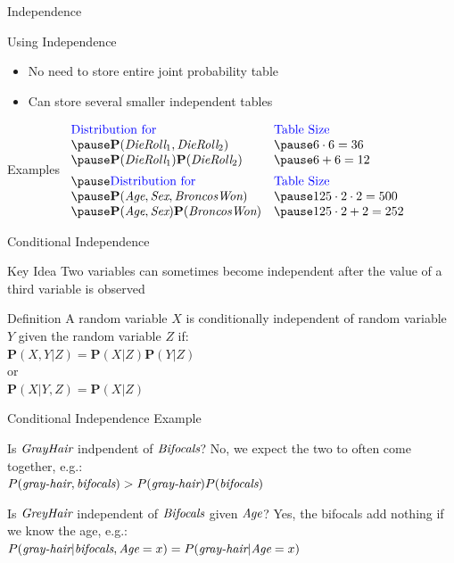\documentclass[12pt]{beamer}
\newcommand{\key}[1]{{\color{blue}#1}}
\newcommand{\EM}[1]{\mbox{\em#1}}
\newcommand{\tab}{\hspace{1em}}
\begin{document}
\begin{frame}{Independence}
	\begin{block}{Using Independence}
		\begin{itemize}
			\item No need to store entire joint probability table
			\item Can store several smaller independent tables
		\end{itemize}
	\end{block}
	\pause
	\begin{block}{Examples}
		$
		\begin{array}{ll}
		\mbox{\key{Distribution for}}              & \mbox{\key{Table Size}} \\
		\pause\mathbf{P}(\EM{DieRoll}_{1},
		                 \EM{DieRoll}_{2})         & \pause 6 \cdot 6 = 36 \\
		\pause\mathbf{P}(\EM{DieRoll}_{1})
		      \mathbf{P}(\EM{DieRoll}_{2})         & \pause 6 + 6 = 12 \\[.5em]
		\pause
		\mbox{\key{Distribution for}}              & \mbox{\key{Table Size}} \\
		\pause\mathbf{P}(\EM{Age}, \EM{Sex},
		                 \EM{BroncosWon})          & \pause 125 \cdot 2 \cdot 2 = 500 \\
		\pause\mathbf{P}(\EM{Age}, \EM{Sex})
		      \mathbf{P}(\EM{BroncosWon})          & \pause 125 \cdot 2 + 2 = 252 \\
		\end{array}
		$
	\end{block}
\end{frame}
\begin{frame}{Conditional Independence}
	\begin{block}{Key Idea}
		Two variables can sometimes become independent after the value of a third variable is observed
	\end{block}
	\begin{block}{Definition}
		A random variable $X$ is \alert{conditionally independent} of random variable $Y$ given the random variable $Z$ if: \\
		\tab$\mathbf{P}(X,Y|Z) = \mathbf{P}(X|Z)\mathbf{P}(Y|Z)$ \\
		or \\
		\tab$\mathbf{P}(X|Y,Z) = \mathbf{P}(X|Z)$
	\end{block}
\end{frame}
\begin{frame}{Conditional Independence Example}
	\begin{block}{Is $\EM{GrayHair}$ indpendent of $\EM{Bifocals}$?}
		\pause
		No, we expect the two to often come together, e.g.: \\[.5em]
		$P(\EM{gray-hair}, \EM{bifocals}) > P(\EM{gray-hair})P(\EM{bifocals})$
	\end{block}
	\pause
	\begin{block}{Is $\EM{GreyHair}$ independent of $\EM{Bifocals}$ given $\EM{Age}$?}
		\pause
		Yes, the bifocals add nothing if we know the age, e.g.: \\[.5em]
		$P(\EM{gray-hair}|\EM{bifocals},\EM{Age}=x) = P(\EM{gray-hair}|\EM{Age}=x)$
	\end{block}
\end{frame}
\end{document}
